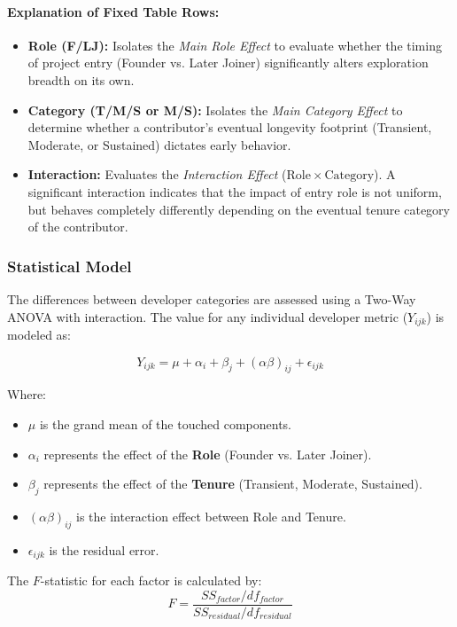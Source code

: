 \paragraph{Explanation of Fixed Table Rows:}
\begin{itemize}
    \item \textbf{Role (F/LJ):} Isolates the \textit{Main Role Effect} to evaluate whether the timing of project entry (Founder vs. Later Joiner) significantly alters exploration breadth on its own.
    \item \textbf{Category (T/M/S or M/S):} Isolates the \textit{Main Category Effect} to determine whether a contributor's eventual longevity footprint (Transient, Moderate, or Sustained) dictates early behavior.
    \item \textbf{Interaction:} Evaluates the \textit{Interaction Effect} ($\mathrm{Role} \times \mathrm{Category}$). A significant interaction indicates that the impact of entry role is not uniform, but behaves completely differently depending on the eventual tenure category of the contributor.
\end{itemize}


\subsubsection*{Statistical Model}
The differences between developer categories are assessed using a Two-Way ANOVA 
with interaction. The value for any individual developer metric ($Y_{ijk}$) 
is modeled as:

\begin{equation}
    Y_{ijk} = \mu + \alpha_i + \beta_j + (\alpha\beta)_{ij} + \epsilon_{ijk}
\end{equation}

Where:
\begin{itemize}
    \item $\mu$ is the grand mean of the touched components.
    \item $\alpha_i$ represents the effect of the \textbf{Role} (Founder vs. Later Joiner).
    \item $\beta_j$ represents the effect of the \textbf{Tenure} (Transient, Moderate, Sustained).
    \item $(\alpha\beta)_{ij}$ is the interaction effect between Role and Tenure.
    \item $\epsilon_{ijk}$ is the residual error.
\end{itemize}

The $F$-statistic for each factor is calculated by:
\begin{equation}
    F = \frac{SS_{factor} / df_{factor}}{SS_{residual} / df_{residual}}
\end{equation}

\newpage 

